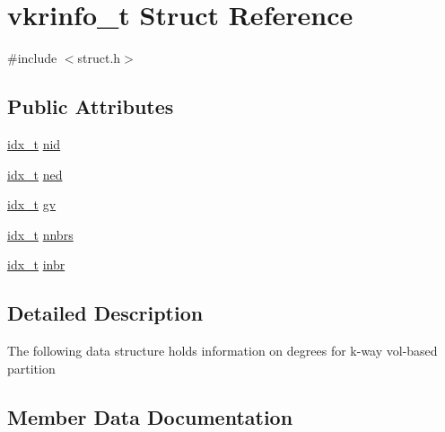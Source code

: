 \hypertarget{structvkrinfo__t}{}\section{vkrinfo\+\_\+t Struct Reference}
\label{structvkrinfo__t}


{\ttfamily \#include $<$struct.\+h$>$}

\subsection*{Public Attributes}
\begin{DoxyCompactItemize}
\item 
\hyperlink{3rd_party_2parmetis-4_80_83_2metis_2include_2metis_8h_aaa5262be3e700770163401acb0150f52}{idx\+\_\+t} \hyperlink{structvkrinfo__t_a9befff2ea2c811563ad38aaf921a8f21}{nid}
\item 
\hyperlink{3rd_party_2parmetis-4_80_83_2metis_2include_2metis_8h_aaa5262be3e700770163401acb0150f52}{idx\+\_\+t} \hyperlink{structvkrinfo__t_a0af0fec11cab7aa7a343c268832cc709}{ned}
\item 
\hyperlink{3rd_party_2parmetis-4_80_83_2metis_2include_2metis_8h_aaa5262be3e700770163401acb0150f52}{idx\+\_\+t} \hyperlink{structvkrinfo__t_a8d9e4e351610f7b03203940a134bcd74}{gv}
\item 
\hyperlink{3rd_party_2parmetis-4_80_83_2metis_2include_2metis_8h_aaa5262be3e700770163401acb0150f52}{idx\+\_\+t} \hyperlink{structvkrinfo__t_aa337d338d253918348c5ba9e4a5082ca}{nnbrs}
\item 
\hyperlink{3rd_party_2parmetis-4_80_83_2metis_2include_2metis_8h_aaa5262be3e700770163401acb0150f52}{idx\+\_\+t} \hyperlink{structvkrinfo__t_a85a0150ff0f0fe87b0fc3bf445b60bca}{inbr}
\end{DoxyCompactItemize}


\subsection{Detailed Description}
The following data structure holds information on degrees for k-\/way vol-\/based partition 

\subsection{Member Data Documentation}
\mbox{\label{structvkrinfo__t_a8d9e4e351610f7b03203940a134bcd74}} 
